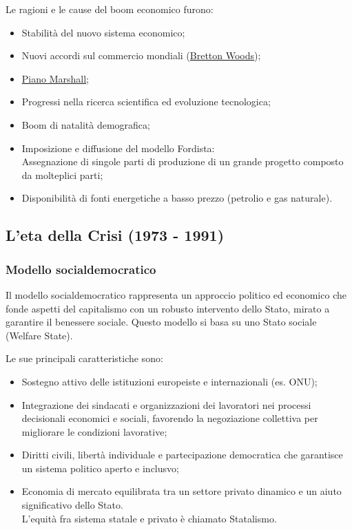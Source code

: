 \documentclass{article}
\begin{document}
Le ragioni e le cause del boom economico furono:
\begin{itemize}
    \item Stabilità del nuovo sistema economico;
    \item Nuovi accordi sul commercio mondiali (\hyperlink{brettonwoods}{\color{blue}\underline{Bretton Woods}});
    \item \hyperlink{marshall}{\color{blue}\underline{Piano Marshall}};
    \item Progressi nella ricerca scientifica ed evoluzione tecnologica;
    \item Boom di natalità demografica;
    \item Imposizione e diffusione del modello Fordista:\\
        Assegnazione di singole parti di produzione di un grande progetto composto da molteplici parti;
    \item Disponibilità di fonti energetiche a basso prezzo (petrolio e gas naturale).
\end{itemize}

\pagebreak

\subsection{L'eta della Crisi (1973 - 1991)}
\subsubsection{Modello socialdemocratico}
Il modello socialdemocratico rappresenta un approccio politico ed economico che fonde aspetti
del capitalismo con un robusto intervento dello Stato, mirato a garantire il benessere sociale.
Questo modello si basa su uno Stato sociale (Welfare State).

Le sue principali caratteristiche sono:
\begin{itemize}
    \item Sostegno attivo delle istituzioni europeiste e internazionali (es. ONU);
    \item Integrazione dei sindacati e organizzazioni dei lavoratori nei processi decisionali
        economici e sociali, favorendo la negoziazione collettiva per migliorare le condizioni
        lavorative;
    \item Diritti civili, libertà individuale e partecipazione democratica che garantisce un
        sistema politico aperto e inclusvo;
    \item Economia di mercato equilibrata tra un settore privato dinamico e un aiuto significativo
        dello Stato.\\ L'equità fra sistema statale e privato è chiamato Statalismo.
\end{itemize}
\end{document}
